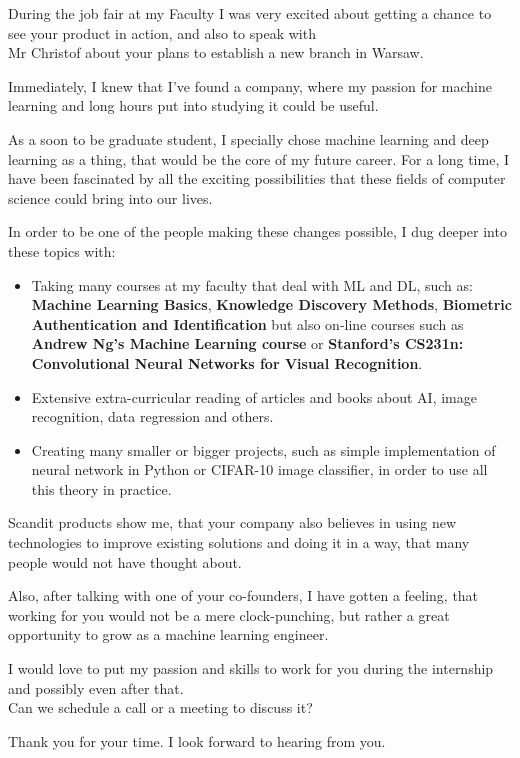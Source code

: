 \documentclass[11pt, a4paper]{awesome-cv}
\begin{document}
\begin{cvletter}

During the job fair at my Faculty I was very excited about getting a chance to see your product in action, and also to speak with \\Mr Christof about your plans to establish a new branch in Warsaw.

Immediately, I knew that I've found a company, where my passion for machine learning and long hours put into studying it could be useful.

As a soon to be graduate student, I specially chose machine learning and deep learning as a thing, that would be the core of my future career. For a long time, I have been fascinated by all the exciting possibilities that these fields of computer science could bring into our lives.

In order to be one of the people making these changes possible, I dug deeper into these topics with:
\begin{itemize}
\item{Taking many courses at my faculty that deal with ML and DL, such as: \textbf{Machine Learning Basics}, \textbf{Knowledge Discovery Methods}, \textbf{Biometric Authentication and Identification} but also on-line courses such as \textbf{Andrew Ng's Machine Learning course} or \textbf{Stanford's CS231n:  Convolutional Neural Networks for Visual Recognition}.}
\item{Extensive extra-curricular reading of articles and books about AI, image recognition, data regression and others.}
\item{Creating many smaller or bigger projects, such as simple implementation of neural network in Python or CIFAR-10 image classifier, in order to use all this theory in practice.}
\end{itemize}

Scandit products show me, that your company also believes in using new technologies 
to improve existing solutions and doing it in a way, that many people would not have thought about.

Also, after talking with one of your co-founders, I have gotten a feeling, that working for you would not be a mere clock-punching, but rather a great opportunity to grow as a machine learning engineer.

I would love to put my passion and skills to work for you during the internship and possibly even after that. \\Can we schedule a call or a meeting to discuss it?

Thank you for your time. I look forward to hearing from you.

\end{cvletter}
\makeletterclosing
\end{document}
